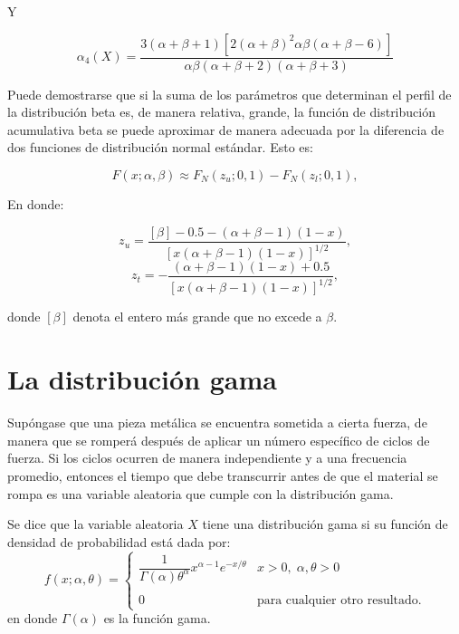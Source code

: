 Y

\begin{tcolorbox}
    $$\alpha_4(X)=\dfrac{3(\alpha+\beta+1)\left[2(\alpha+\beta)^2\alpha\beta (\alpha+\beta - 6)\right]}{\alpha\beta (\alpha+\beta + 2)(\alpha +\beta + 3)}$$
\end{tcolorbox}

Puede demostrarse que si la suma de los parámetros que determinan el perfil de la distribución beta es, de manera relativa, grande, la función de distribución acumulativa beta se puede aproximar de manera adecuada por la diferencia de dos funciones de distribución normal estándar. Esto es:

$$F(x;\alpha, \beta) \approx F_N(z_u;0,1)-F_N(z_l; 0,1),$$

En donde:

$$z_u=\dfrac{[\beta] - 0.5 - (\alpha+\beta-1)(1-x)}{\left[x(\alpha+\beta - 1)(1-x)\right]^{1/2}},$$
$$z_t=-\dfrac{(\alpha+\beta-1)(1-x)+0.5}{\left[x(\alpha+\beta - 1)(1-x)\right]^{1/2}},$$

donde $[\beta]$ denota el entero más grande que no excede a $\beta$.


\section{La distribución gama}

Supóngase que una pieza metálica se encuentra sometida a cierta fuerza, de manera que se romperá después de aplicar un número específico de ciclos de fuerza. Si los ciclos ocurren de manera independiente y a una frecuencia promedio, entonces el tiempo que debe transcurrir antes de que el material se rompa es una variable aleatoria que cumple con la distribución gama.

\begin{tcolorbox}
    \begin{def.}
	Se dice que la variable aleatoria $X$ tiene una distribución gama si su función de densidad de probabilidad está dada por:
	$$f(x;\alpha,\theta)=\left\{\begin{array}{ll}
		\dfrac{1}{\Gamma(\alpha)\theta^\alpha}x^{\alpha-1}e^{-x/\theta} & x>0,\; \alpha,\theta>0\\\\
		0 & \mbox{para cualquier otro resultado.}
	\end{array}\right.$$
	en donde $\Gamma(\alpha)$ es la función gama.\\\\
    \end{def.}
\end{tcolorbox}

